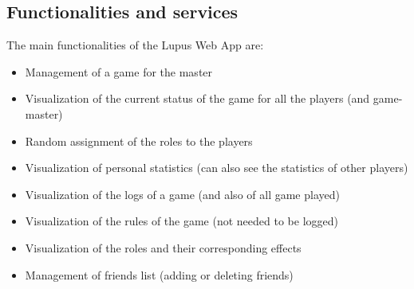 \subsection{Functionalities and services}
The main functionalities of the Lupus Web App are:
\begin{itemize}
    \item Management of a game for the master
    \item Visualization of the current status of the game for all the players (and game-master)
    \item Random assignment of the roles to the players
    \item Visualization of personal statistics (can also see the statistics of other players)
    \item Visualization of the logs of a game (and also of all game played)
    \item Visualization of the rules of the game (not needed to be logged)
    \item Visualization of the roles and their corresponding effects
    \item Management of friends list (adding or deleting friends) 

\end{itemize}



